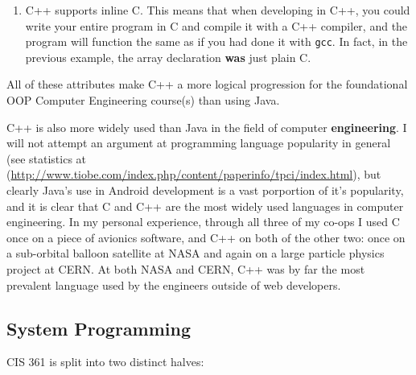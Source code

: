 \documentclass[12pt]{article}
\numberwithin{figure}{section}
\numberwithin{equation}{section}
\begin{document}
{\begin{enumerate}
\begin{lstlisting}[language=C,label=c-code]
    char array[256];    //C
\end{lstlisting}

\begin{lstlisting}[language=C++,label=c-code]
    char array[256];    //C++
\end{lstlisting}

\begin{lstlisting}[language=Java,label=c-code]
    char[] array = new char[256];   //Java
\end{lstlisting}

Clearly, in this simple scenario, Java's syntax is very much different
than C, and can even be confusing (i.e. where to place the
\texttt{{[} {]}}), which brings us to the next point:

\item   C++ supports inline C. This means that when developing in C++, you
        could write your entire program in C and compile it with a C++
        compiler, and the program will function the same as if you had done it
        with \texttt{gcc}. In fact, in the previous example, the array
        declaration \textbf{was} just plain C.
\end{enumerate}

All of these attributes make C++ a more logical progression for the
foundational OOP Computer Engineering course(s) than using Java.

\bigskip

C++ is also more widely used than Java in the field of computer
\textbf{engineering}. I will not attempt an argument at programming
language popularity in general (see statistics at
(\url{http://www.tiobe.com/index.php/content/paperinfo/tpci/index.html}),
but clearly Java's use in Android development is a vast porportion of
it's popularity, and it is clear that C and C++ are the most widely used
languages in computer engineering. In my personal experience, through
all three of my co-ops I used C once on a piece of avionics software,
and C++ on both of the other two: once on a sub-orbital balloon
satellite at NASA and again on a large particle physics project at CERN.
At both NASA and CERN, C++ was by far the most prevalent language used
by the engineers outside of web developers.

\subsection{System Programming}\label{system-programming}
CIS 361 is split into two distinct halves:

}
\end{document}

